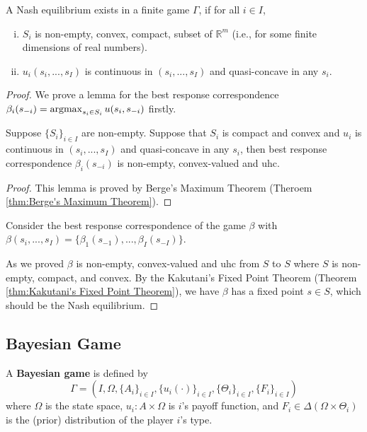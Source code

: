 \documentclass[11pt]{elegantbook}
\newcommand{\argmax}{\operatornamewithlimits{argmax}}
\begin{document}
\begin{theorem}
    A Nash equilibrium exists in a finite game $\Gamma$, if for all $i\in I$,
    \begin{enumerate}[(i).]
        \item $S_i$ is non-empty, convex, compact, subset of $\mathbb{R}^m$ (i.e., for some finite dimensions of real numbers).
        \item $u_i(s_i,...,s_I)$ is continuous in $(s_i,...,s_I)$ and quasi-concave in any $s_i$.
    \end{enumerate}
\end{theorem}
\begin{proof}
    We prove a lemma for the best response correspondence $\beta_i(s_{-i})=\argmax_{s_i\in S_i}u(s_i,s_{-i})$ firstly.
    \begin{lemma}
        Suppose $\{S_i\}_{i\in I}$ are non-empty. Suppose that $S_i$ is compact and convex and $u_i$ is continuous in $(s_i,...,s_I)$ and quasi-concave in any $s_i$, then best response correspondence $\beta_i(s_{-i})$ is non-empty, convex-valued and uhc.
    \end{lemma}
    \begin{proof}
        This lemma is proved by Berge's Maximum Theorem (Theroem \ref{thm:Berge's Maximum Theorem}).
    \end{proof}
    Consider the best response correspondence of the game $\beta$ with $\beta(s_i,...,s_I)=\{\beta_1(s_{-1}),...,\beta_I(s_{-I})\}$.

    As we proved $\beta$ is non-empty, convex-valued and uhc from $S$ to $S$ where $S$ is non-empty, compact, and convex. By the Kakutani's Fixed Point Theorem (Theorem \ref{thm:Kakutani's Fixed Point Theorem}), we have $\beta$ has a fixed point $s\in S$, which should be the Nash equilibrium.
\end{proof}

\subsection{Bayesian Game}
\begin{definition}
    \normalfont
    A \textbf{Bayesian game} is defined by $$\Gamma=(I, \Omega, \{A_i\}_{i\in I}, \{u_i(\cdot)\}_{i\in I},\{\Theta_i\}_{i\in I}, \{F_i\}_{i\in I})$$
    where $\Omega$ is the state space, $u_i:A\times \Omega$ is $i$'s payoff function, and $F_i\in\Delta\left(\Omega\times\Theta_i\right)$ is the (prior) distribution of the player $i$'s type.
\end{definition}
\end{document}
